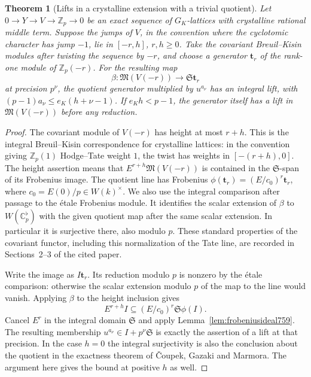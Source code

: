 \documentclass[a4paper,11pt]{article}
\newtheorem{theorem}[proposition]{Theorem}
\theoremstyle{definition}
\theoremstyle{remark}
\newcommand{\ZZ}{\mathbb Z}\newcommand{\ord}{\operatorname{ord}}
\numberwithin{equation}{section}
\begin{document}
\begin{theorem}[Lifts in a crystalline extension with a trivial quotient]
\leavevmode\label{thm:integrallifts759}
Let \(0\to Y\to V\to\ZZ_p\to0\) be an exact sequence of
\(G_K\)-lattices with crystalline rational middle term. Suppose
the jumps of \(V\), in the convention where the cyclotomic
character has jump \(-1\), lie in \([-r,h]\), \(r,h\ge0\).
Take the covariant Breuil--Kisin modules after twisting the
sequence by \(-r\), and choose a generator \(\mathbf t_r\)
of the rank-one module of \(\ZZ_p(-r)\). For the resulting map
\[
        \beta:\mathfrak M(V(-r))\longrightarrow\mathfrak S\mathbf t_r
\]
at precision \(p^\nu\), the quotient generator multiplied by
\(u^{a_\nu}\) has an integral lift, with
\((p-1)a_\nu\le e_K(h+\nu-1)\).
If \(e_K h<p-1\), the generator itself has a lift in
\(\mathfrak M(V(-r))\) before any reduction.
\end{theorem}
\begin{proof}
The covariant module of \(V(-r)\) has height at most \(r+h\).
This is the integral Breuil--Kisin correspondence for crystalline
lattices: in the convention giving \(\ZZ_p(1)\) Hodge--Tate
weight \(1\), the twist has weights in \([-(r+h),0]\). The
height assertion means that \(E^{r+h}\mathfrak M(V(-r))\)
is contained in the \(\mathfrak S\)-span of its Frobenius
image. The quotient line has Frobenius
\(\phi(\mathbf t_r)=(E/c_0)^r\mathbf t_r\), where
\(c_0=E(0)/p\in W(k)^\times\). We also use the integral
comparison after passage to the étale Frobenius module.
It identifies the scalar extension of \(\beta\) to
\(W(\mathbb C_p^\flat)\) with the given quotient map after
the same scalar extension. In particular it is surjective
there, also modulo \(p\). These standard properties of the
covariant functor, including this normalization of the Tate
line, are recorded in Sections~2--3 of the cited paper.
~\cite{III-II-cgmexact759}

Write the image as \(I\mathbf t_r\). Its reduction modulo
\(p\) is nonzero by the étale comparison: otherwise the
scalar extension modulo \(p\) of the map to the line would
vanish. Applying \(\beta\) to the height inclusion gives
\[
                E^{r+h}I\subseteq (E/c_0)^r\mathfrak S\phi(I).
\]
Cancel \(E^r\) in the integral domain \(\mathfrak S\) and
apply Lemma~\ref{lem:frobeniusideal759}. The resulting
membership \(u^{a_\nu}\in I+p^\nu\mathfrak S\) is exactly
the assertion of a lift at that precision. In the case \(h=0\)
the integral surjectivity is also the conclusion about the
quotient in the exactness theorem of \v{C}oupek, Gazaki and
Marmora. The argument here gives the bound at positive \(h\)
as well.
\end{proof}
\end{document}
